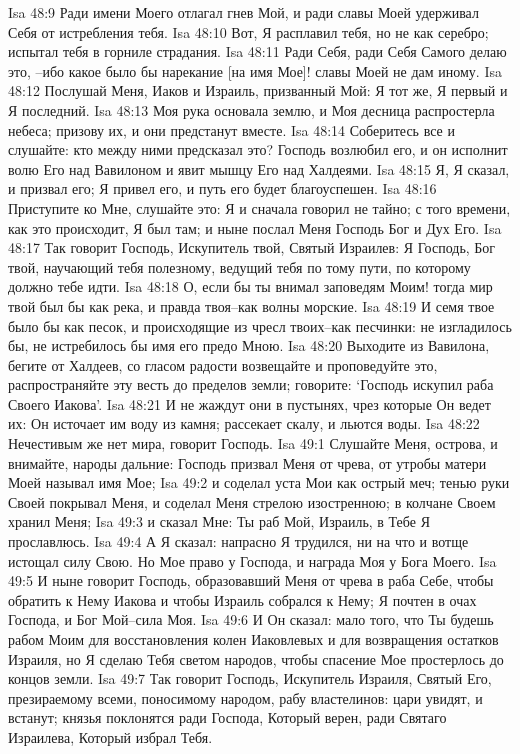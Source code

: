 Isa 48:9  Ради имени Моего отлагал гнев Мой, и ради славы Моей удерживал Себя от истребления тебя.
Isa 48:10  Вот, Я расплавил тебя, но не как серебро; испытал тебя в горниле страдания.
Isa 48:11  Ради Себя, ради Себя Самого делаю это, --ибо какое было бы нарекание [на имя Мое]! славы Моей не дам иному.
Isa 48:12  Послушай Меня, Иаков и Израиль, призванный Мой: Я тот же, Я первый и Я последний.
Isa 48:13  Моя рука основала землю, и Моя десница распростерла небеса; призову их, и они предстанут вместе.
Isa 48:14  Соберитесь все и слушайте: кто между ними предсказал это? Господь возлюбил его, и он исполнит волю Его над Вавилоном и явит мышцу Его над Халдеями.
Isa 48:15  Я, Я сказал, и призвал его; Я привел его, и путь его будет благоуспешен.
Isa 48:16  Приступите ко Мне, слушайте это: Я и сначала говорил не тайно; с того времени, как это происходит, Я был там; и ныне послал Меня Господь Бог и Дух Его.
Isa 48:17  Так говорит Господь, Искупитель твой, Святый Израилев: Я Господь, Бог твой, научающий тебя полезному, ведущий тебя по тому пути, по которому должно тебе идти.
Isa 48:18  О, если бы ты внимал заповедям Моим! тогда мир твой был бы как река, и правда твоя--как волны морские.
Isa 48:19  И семя твое было бы как песок, и происходящие из чресл твоих--как песчинки: не изгладилось бы, не истребилось бы имя его предо Мною.
Isa 48:20  Выходите из Вавилона, бегите от Халдеев, со гласом радости возвещайте и проповедуйте это, распространяйте эту весть до пределов земли; говорите: `Господь искупил раба Своего Иакова'.
Isa 48:21  И не жаждут они в пустынях, чрез которые Он ведет их: Он источает им воду из камня; рассекает скалу, и льются воды.
Isa 48:22  Нечестивым же нет мира, говорит Господь.
Isa 49:1  Слушайте Меня, острова, и внимайте, народы дальние: Господь призвал Меня от чрева, от утробы матери Моей называл имя Мое;
Isa 49:2  и соделал уста Мои как острый меч; тенью руки Своей покрывал Меня, и соделал Меня стрелою изостренною; в колчане Своем хранил Меня;
Isa 49:3  и сказал Мне: Ты раб Мой, Израиль, в Тебе Я прославлюсь.
Isa 49:4  А Я сказал: напрасно Я трудился, ни на что и вотще истощал силу Свою. Но Мое право у Господа, и награда Моя у Бога Моего.
Isa 49:5  И ныне говорит Господь, образовавший Меня от чрева в раба Себе, чтобы обратить к Нему Иакова и чтобы Израиль собрался к Нему; Я почтен в очах Господа, и Бог Мой--сила Моя.
Isa 49:6  И Он сказал: мало того, что Ты будешь рабом Моим для восстановления колен Иаковлевых и для возвращения остатков Израиля, но Я сделаю Тебя светом народов, чтобы спасение Мое простерлось до концов земли.
Isa 49:7  Так говорит Господь, Искупитель Израиля, Святый Его, презираемому всеми, поносимому народом, рабу властелинов: цари увидят, и встанут; князья поклонятся ради Господа, Который верен, ради Святаго Израилева, Который избрал Тебя.
